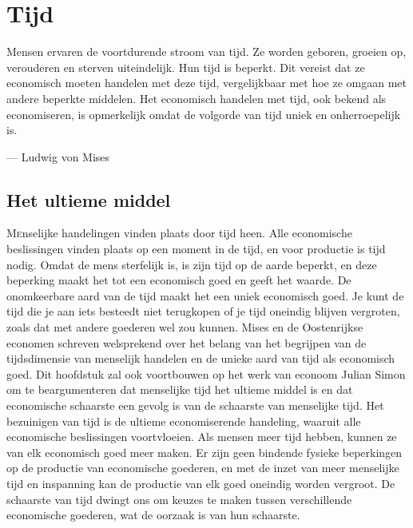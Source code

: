 \chapter{Tijd}

\begin{blockquotebox}
    Mensen ervaren de voortdurende stroom van tijd. Ze worden geboren, groeien op, verouderen en sterven uiteindelijk. Hun tijd is beperkt. Dit vereist dat ze economisch moeten handelen met deze tijd, vergelijkbaar met hoe ze omgaan met andere beperkte middelen. Het economisch handelen met tijd, ook bekend als economiseren, is opmerkelijk omdat de volgorde van tijd uniek en onherroepelijk is.\footnotemark
    \par\raggedleft--- Ludwig von Mises
\end{blockquotebox}
\autocite{24}

\section{Het ultieme middel}

\lettrine{M}enselijke handelingen vinden plaats door tijd heen. Alle economische beslissingen vinden plaats op een moment in de tijd, en voor productie is tijd nodig. Omdat de mens sterfelijk is, is zijn tijd op de aarde beperkt, en deze beperking maakt het tot een economisch goed en geeft het waarde. De onomkeerbare aard van de tijd maakt het een uniek economisch goed. Je kunt de tijd die je aan iets besteedt niet terugkopen of je tijd oneindig blijven vergroten, zoals dat met andere goederen wel zou kunnen. Mises en de Oostenrijkse economen schreven welsprekend over het belang van het begrijpen van de tijdsdimensie van menselijk handelen en de unieke aard van tijd als economisch goed. Dit hoofdstuk zal ook voortbouwen op het werk van econoom Julian Simon om te beargumenteren dat menselijke tijd het ultieme middel is en dat economische schaarste een gevolg is van de schaarste van menselijke tijd. Het bezuinigen van tijd is de ultieme economiserende handeling, waaruit alle economische beslissingen voortvloeien. Als mensen meer tijd hebben, kunnen ze van elk economisch goed meer maken.\autocite{25} Er zijn geen bindende fysieke beperkingen op de productie van economische goederen, en met de inzet van meer menselijke tijd en inspanning kan de productie van elk goed oneindig worden vergroot. De schaarste van tijd dwingt ons om keuzes te maken tussen verschillende economische goederen, wat de oorzaak is van hun schaarste.

